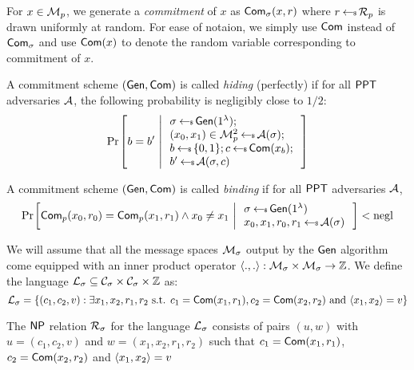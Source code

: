 For $x\in \mathcal{M}_p$, we generate a {\em commitment} of $x$
as $\mathsf{Com}_\sigma(x,r)$ where $r\hskip2.3pt{\gets\!\!\mbox{\tiny${\$}$\normalsize}}\, \mathcal{R}_p$ is drawn uniformly at random. For ease
of notaion, we simply use $\mathsf{Com}$ instead of $\mathsf{Com}_\sigma$ and use $\mathsf{Com}(x)$ to denote the random variable corresponding to commitment of $x$. 

\begin{definition}\label{defn:hidingcomm}
A commitment scheme $(\mathsf{Gen},\mathsf{Com})$ is called {\em hiding} (perfectly) if for
all $\mathsf{PPT}$ adversaries $\mathcal{A}$, the following probability is negligibly close to
$1/2$:
\begin{align*}
\condprob{b=b'}{
\begin{array}{l}
\sigma\sample \csetup(\secparam); \\
(x_0,x_1)\in \mc{M}^2_p\sample \adv(\sigma); \\
b\sample \{0,1\}; c\sample \comm(x_b);\\
b'\sample \adv(\sigma,c)
\end{array}
}
\end{align*}
\end{definition}

\begin{definition}\label{defn:bindingcomm}
A commitment scheme $(\mathsf{Gen},\mathsf{Com})$ is called {\em binding} if for all $\mathsf{PPT}$
adversaries $\mathcal{A}$, 
\begin{align*}
\condprob{\comm_p(x_0,r_0)=\comm_p(x_1,r_1)\wedge x_0\neq x_1}{
\begin{array}{l}
\sigma\sample \csetup(\secparam) \\
x_0,x_1,r_0,r_1 \sample \adv(\sigma)
\end{array}
} < \negl
\end{align*}

\end{definition}

We will assume that all the message spaces $\mathcal{M}_\sigma$ output by the
$\mathsf{Gen}$ algorithm come equipped with an inner product operator
$\langle .,.\rangle:\mathcal{M}_\sigma\times \mathcal{M}_\sigma\rightarrow \mathbb{Z}$. We define
the language $\mathcal{L}_\sigma\subseteq \mathcal{C}_\sigma\times \mathcal{C}_\sigma\times
\mathbb{Z}$ as:
\begin{equation*}
\mathcal{L}_\sigma = \{(c_1,c_2,v):\exists x_1,x_2,r_1,r_2 \text{ s.t. }
c_1=\mathsf{Com}(x_1,r_1), c_2=\mathsf{Com}(x_2,r_2) \text{ and } \langle x_1,x_2\rangle=v\} 
\end{equation*}

The $\mathsf{NP}$ relation $\mathcal{R}_\sigma$ for the language $\mathcal{L}_\sigma$ consists
of pairs $(u,w)$ with $u=(c_1,c_2,v)$ and $w=(x_1,x_2,r_1,r_2)$ such that
$c_1=\mathsf{Com}(x_1,r_1)$, $c_2=\mathsf{Com}(x_2,r_2)$ and $\langle x_1,x_2\rangle=v$ 

